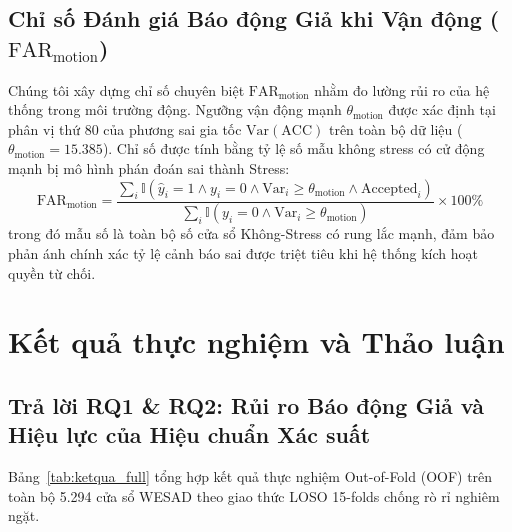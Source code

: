 \documentclass[conference]{IEEEtran}
\begin{document}
\subsection{Chỉ số Đánh giá Báo động Giả khi Vận động \texorpdfstring{($\text{FAR}_{\text{motion}}$)}{(FAR-motion)}}
Chúng tôi xây dựng chỉ số chuyên biệt $\text{FAR}_{\text{motion}}$ nhằm đo lường rủi ro của hệ thống trong môi trường động. Ngưỡng vận động mạnh $\theta_{\text{motion}}$ được xác định tại phân vị thứ 80 của phương sai gia tốc $\text{Var}(\text{ACC})$ trên toàn bộ dữ liệu ($\theta_{\text{motion}} = 15.385$). Chỉ số được tính bằng tỷ lệ số mẫu không stress có cử động mạnh bị mô hình phán đoán sai thành Stress:
\begin{equation}
\text{FAR}_{\text{motion}} = \frac{\sum_{i} \mathbb{I}(\hat{y}_i = 1 \land y_i = 0 \land \text{Var}_i \ge \theta_{\text{motion}} \land \text{Accepted}_i)}{\sum_{i} \mathbb{I}(y_i = 0 \land \text{Var}_i \ge \theta_{\text{motion}})} \times 100\%
\end{equation}
trong đó mẫu số là toàn bộ số cửa sổ Không-Stress có rung lắc mạnh, đảm bảo phản ánh chính xác tỷ lệ cảnh báo sai được triệt tiêu khi hệ thống kích hoạt quyền từ chối.

\section{Kết quả thực nghiệm và Thảo luận}

\subsection{Trả lời RQ1 \& RQ2: Rủi ro Báo động Giả và Hiệu lực của Hiệu chuẩn Xác suất}

Bảng~\ref{tab:ketqua_full} tổng hợp kết quả thực nghiệm Out-of-Fold (OOF) trên toàn bộ 5.294 cửa sổ WESAD theo giao thức LOSO 15-folds chống rò rỉ nghiêm ngặt.
\end{document}
